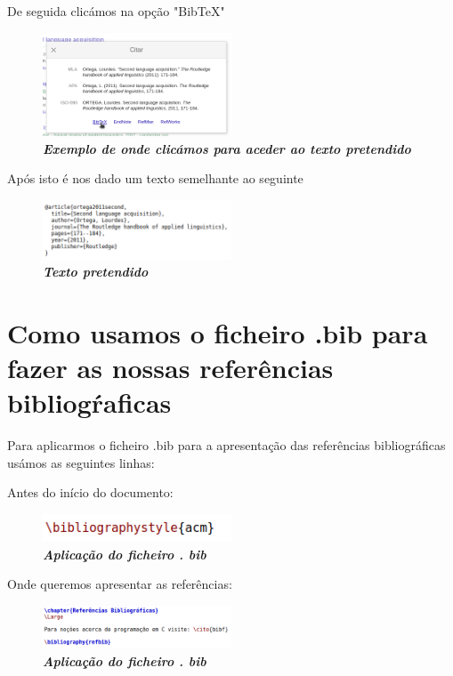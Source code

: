 \documentclass[a4wide]{report}
\begin{document}
{{{{De seguida clicámos na opção "BibTeX"

\begin{figure}[hbt]
    \centering
    \includegraphics[width=0.50\textwidth]{bibtex.png}
    \caption{\textbf{\textit{Exemplo de onde clicámos para aceder ao texto pretendido}} \label{fig:imagem}}
\end{figure}

\newpage
Após isto é nos dado um texto semelhante ao seguinte

\begin{figure}[hbt]
    \centering
    \includegraphics[width=0.50\textwidth]{textobib.png}
    \caption{\textbf{\textit{Texto pretendido}} \label{fig:imagem}}
\end{figure}

\section{Como usamos o ficheiro .bib para fazer as nossas referências bibliogŕaficas}
\Large

Para aplicarmos o ficheiro .bib para a apresentação das referências bibliográficas usámos as seguintes linhas:

Antes do início do documento:

\begin{figure}[hbt]
    \centering
    \includegraphics[width=0.50\textwidth]{a.png}
    \caption{\textbf{\textit{Aplicação do ficheiro . bib}} \label{fig:imagem}}
\end{figure}

Onde queremos apresentar as referências:
\begin{figure}[hbt]
    \centering
    \includegraphics[width=0.50\textwidth]{c.png}
    \caption{\textbf{\textit{Aplicação do ficheiro . bib}} \label{fig:imagem}}
\end{figure}

}}}}
\end{document}
